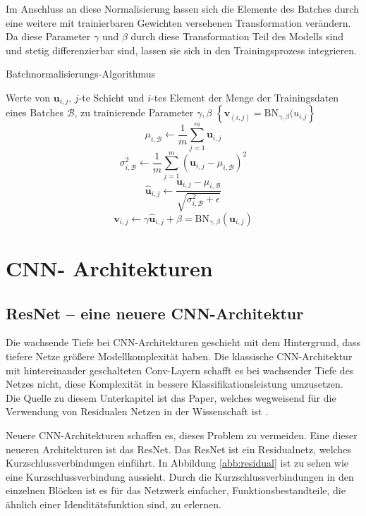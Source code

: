 Im Anschluss an diese Normalisierung lassen sich die Elemente des Batches durch eine weitere mit trainierbaren Gewichten versehenen Transformation verändern. Da diese Parameter $\gamma$ und $\beta$ durch diese Transformation Teil des Modells sind und stetig differenzierbar sind, lassen sie sich in den Trainingsprozess integrieren.

\renewcommand{\algorithmicrequire}{\textbf{Eingabe:}}
\renewcommand{\algorithmicensure}{\textbf{Ausgabe:}}


\begin{algorithm}[H]
\caption{Batchnormalisierungs-Algorithmus}
\begin{algorithmic}
\REQUIRE Werte von $\mathbf{u}_{i,j}$, $j$-te  Schicht und $i$-tes Element der Menge der Trainingsdaten  eines Batches $\mathcal{B}$, zu trainierende Parameter $\gamma, \beta$
\ENSURE $\left\{ \mathbf{v}_{(i,j)} =\text{BN}_{\gamma, \beta}(u_{i.j} \right\} $
\STATE $$\mu_{i,\mathcal{B}} \leftarrow \frac{1}{m}\sum_{j=1}^{m} \mathbf{u}_{i,j}$$
\STATE $$\sigma^2_{i,\mathcal{B}} \leftarrow \frac{1}{m} \sum_{j=1}^m \left( \mathbf{u}_{i,j} -\mu_{i,\mathcal{B}}\right)^2$$
\STATE $$ \hat{\mathbf{u}}_{i,j} \leftarrow \frac{\mathbf{u}_{i,j}-\mu_{i,\mathcal{B}}}{\sqrt{\sigma_{i,\mathcal{B}}^2+\epsilon}}$$
\STATE $$\mathbf{v}_{i,j} \leftarrow \gamma \hat{\mathbf{u}}_{i,j} + \beta  = \text{BN}_{\gamma,\beta}(\mathbf{u}_{i,j})$$
\end{algorithmic}
\label{alg:bn}
\end{algorithm}


\color{black}

\section{CNN- Architekturen}\label{sec:archit}
\subsection{ResNet -- eine neuere CNN-Architektur}\label{sec:res}
Die wachsende Tiefe bei CNN-Architekturen geschieht mit dem Hintergrund, dass tiefere Netze größere Modellkomplexität haben. Die klassische CNN-Architektur mit hintereinander geschalteten Conv-Layern schafft es bei wachsender Tiefe des Netzes nicht, diese Komplexität in bessere Klassifikationsleistung umzusetzen. Die Quelle zu diesem Unterkapitel ist das Paper, welches wegweisend für die Verwendung von Residualen Netzen in der Wissenschaft ist \cite{resnet}.


Neuere CNN-Architekturen schaffen es, dieses Problem zu vermeiden. Eine dieser neueren Architekturen ist das ResNet. Das ResNet ist ein Residualnetz, welches Kurzschlussverbindungen einführt. In Abbildung \ref{abb:residual} ist zu sehen wie eine Kurzschlussverbindung aussieht. Durch die Kurzschlussverbindungen in den einzelnen Blöcken ist es für das Netzwerk einfacher, Funktionsbestandteile, die ähnlich einer Idenditätsfunktion sind, zu erlernen.   

